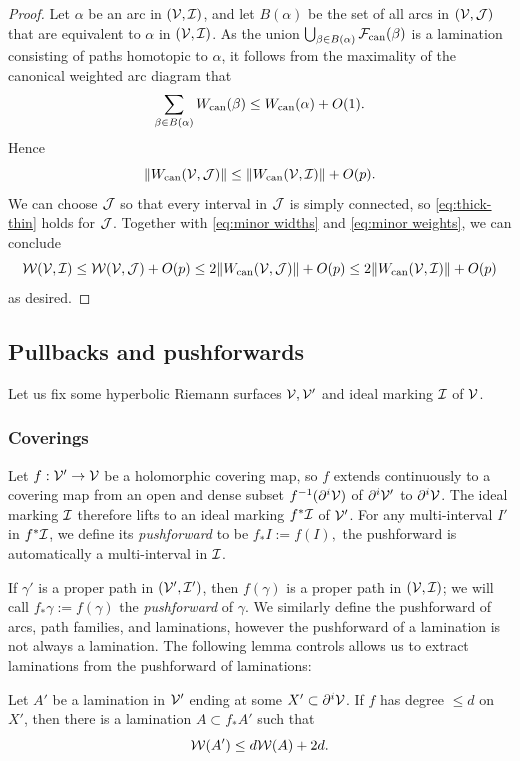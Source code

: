 \documentclass[12pt]{amsart}
\begin{document}
\begin{proof}
	Let $\alpha$ be an arc in $(\mathcal V, \mathcal I)$, and let $B(\alpha)$ be the set of all arcs in $(\mathcal V, \mathcal J)$ that are equivalent to $\alpha$ in $(\mathcal V, \mathcal I)$. As the union $\bigcup_{\beta\in B(\alpha)}\mathcal F_{\operatorname{can}}(\beta)$ is a lamination consisting of paths homotopic to $\alpha$, it follows from the maximality of the canonical weighted arc diagram that
	$$\sum_{\beta\in B(\alpha)}W_{\operatorname{can}}(\beta)\leq W_{\operatorname{can}}(\alpha)+O(1).$$
	Hence 
	\begin{equation}\label{eq:minor weights}
		\|W_{\operatorname{can}}(\mathcal V, \mathcal J)\|\leq \|W_{\operatorname{can}}(\mathcal V, \mathcal I)\|+O(p).
	\end{equation}
	We can choose $\mathcal J$ so that every interval in $\mathcal J$ is simply connected, so \eqref{eq:thick-thin} holds for $\mathcal J$. Together with \eqref{eq:minor widths} and \eqref{eq:minor weights}, we can conclude
	$$\mathcal W(\mathcal V, \mathcal I)\leq \mathcal W(\mathcal V, \mathcal J)+O(p)\leq 2\|W_{\operatorname{can}}(\mathcal V, \mathcal J)\|+O(p)\leq 2\|W_{\operatorname{can}}(\mathcal V, \mathcal I)\|+O(p)$$
	as desired.
\end{proof}



\subsection{Pullbacks and pushforwards}\label{app:dynamics}

Let us fix some hyperbolic Riemann surfaces $\mathcal V, \mathcal V'$ and ideal marking $\mathcal I$ of $\mathcal V$. 


\subsubsection{Coverings} Let $f: \mathcal V'\to \mathcal V$ be a holomorphic covering map,
so $f$ extends continuously to a covering map from an open and dense subset $f^{-1}(\partial^i \mathcal V)$ of $\partial^i \mathcal V'$ to $\partial^i \mathcal V$. The ideal marking $\mathcal I$ therefore lifts to an ideal marking $f^*\mathcal I$ of $\mathcal V'$. 
For any multi-interval $I'$ in $f^*\mathcal I$, we define its \emph{pushforward} to be $f_*I:= f(I),$ the pushforward is automatically a multi-interval in $\mathcal I$.



If $\gamma'$ is a proper path in $(\mathcal V', \mathcal I')$, then $f(\gamma)$ is a proper path in $(\mathcal V, \mathcal I)$; we will call $f_*\gamma:=f(\gamma)$ the \emph{pushforward} of $\gamma$. 
We  similarly define the pushforward of arcs, path families, and laminations, however the pushforward of a lamination is not always a lamination. 
The following lemma controls allows us to extract laminations from the pushforward of laminations:

\begin{lemma}\label{lem:push forward laminations}
	Let $A'$ be a lamination in $\mathcal V'$ ending at some $X'\subset \partial^i \mathcal V$.   If $f$ has degree $\leq d$ on $X'$, then there is a lamination $A\subset f_*A'$ such that 
	$$\mathcal W(A')\leq d\mathcal W(A)+2d.$$
\end{lemma}
\end{document}
